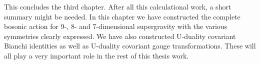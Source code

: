 This concludes the third chapter. After all this calculational work, a short summary might be needed. In this chapter 
we have constructed the complete bosonic action for 9-, 8- and 7-dimensional supergravity with the various symmetries clearly expressed. 
We have also constructed U-duality covariant Bianchi identities as well as U-duality covariant gauge transformations. 
These will all play a very important role in the rest of this thesis work.





